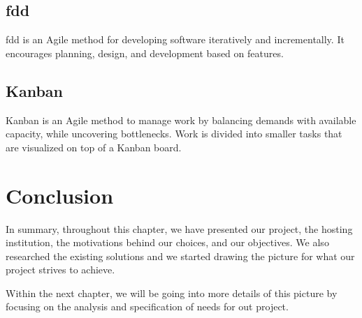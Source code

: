 \subsection{\acrlong{fdd}}

\acrfull{fdd} is an Agile method for developing software iteratively and incrementally. It encourages planning, design, and development based on features.

\subsection{Kanban}

Kanban is an Agile method to manage work by balancing demands with available capacity, while uncovering bottlenecks.
Work is divided into smaller tasks that are visualized on top of a Kanban board.

\section{Conclusion}

In summary, throughout this chapter, we have presented our project, the hosting institution, the motivations behind our choices, and our objectives. We also researched the existing solutions and we started drawing the picture for what our project strives to achieve.

Within the next chapter, we will be going into more details of this picture by focusing on the analysis and specification of needs for out project.